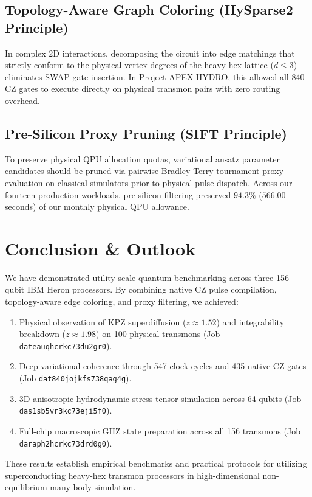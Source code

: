 \documentclass[twocolumn,secnumarabic,amssymb, nobibnotes, aps, prx, superscriptaddress]{revtex4-2}
\begin{document}
\subsection{Topology-Aware Graph Coloring (HySparse2 Principle)}
In complex 2D interactions, decomposing the circuit into edge matchings that strictly conform to the physical vertex degrees of the heavy-hex lattice ($d \le 3$) eliminates SWAP gate insertion. In Project APEX-HYDRO, this allowed all 840 $\text{CZ}$ gates to execute directly on physical transmon pairs with zero routing overhead.

\subsection{Pre-Silicon Proxy Pruning (SIFT Principle)}
To preserve physical QPU allocation quotas, variational ansatz parameter candidates should be pruned via pairwise Bradley-Terry tournament proxy evaluation on classical simulators prior to physical pulse dispatch. Across our fourteen production workloads, pre-silicon filtering preserved $94.3\%$ ($566.00$ seconds) of our monthly physical QPU allowance.

\section{Conclusion \& Outlook}
We have demonstrated utility-scale quantum benchmarking across three 156-qubit IBM Heron processors. By combining native $\text{CZ}$ pulse compilation, topology-aware edge coloring, and proxy filtering, we achieved:
\begin{enumerate}
    \item Physical observation of KPZ superdiffusion ($z \approx 1.52$) and integrability breakdown ($z \approx 1.98$) on 100 physical transmons (Job \texttt{dateauqhcrkc73du2gr0}).
    \item Deep variational coherence through 547 clock cycles and 435 native $\text{CZ}$ gates (Job \texttt{dat840jojkfs738qag4g}).
    \item 3D anisotropic hydrodynamic stress tensor simulation across 64 qubits (Job \texttt{das1sb5vr3kc73eji5f0}).
    \item Full-chip macroscopic GHZ state preparation across all 156 transmons (Job \texttt{daraph2hcrkc73drd0g0}).
\end{enumerate}
These results establish empirical benchmarks and practical protocols for utilizing superconducting heavy-hex transmon processors in high-dimensional non-equilibrium many-body simulation.
\end{document}
